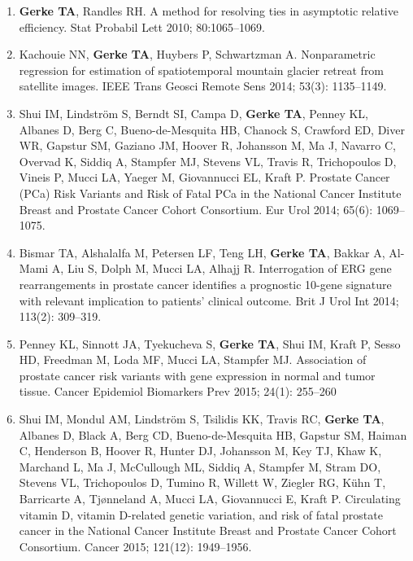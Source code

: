 \documentclass[11pt, a4paper]{article} %
\begin{document}
\begin{enumerate}[leftmargin=*]
\item{} {\bf Gerke TA}, Randles RH. A method for resolving ties in asymptotic relative efficiency.
Stat Probabil Lett 2010; 80:1065--1069.

\item{} Kachouie NN, {\bf Gerke TA}, Huybers P, Schwartzman A. Nonparametric regression for estimation of spatiotemporal mountain glacier retreat from satellite images. IEEE Trans Geosci Remote Sens 2014; 53(3): 1135--1149.

\item{} Shui IM, Lindstr\"{o}m S, Berndt SI, Campa D, {\bf Gerke TA}, Penney KL, Albanes D, Berg C, Bueno-de-Mesquita HB, Chanock S, Crawford ED, Diver WR, Gapstur SM, Gaziano JM, Hoover R, Johansson M, Ma J, Navarro C, Overvad K, Siddiq A, Stampfer MJ, Stevens VL, Travis R, Trichopoulos D, Vineis P, Mucci LA, Yaeger M, Giovannucci EL, Kraft P. Prostate Cancer (PCa) Risk Variants and Risk of Fatal PCa in the National Cancer Institute Breast and Prostate Cancer Cohort Consortium. Eur Urol 2014; 65(6): 1069--1075.

\item{} Bismar TA, Alshalalfa M, Petersen LF, Teng LH, {\bf Gerke TA}, Bakkar A, Al-Mami A, Liu S, Dolph M, Mucci LA, Alhajj R. Interrogation of ERG gene rearrangements in prostate cancer identifies a prognostic 10-gene signature with relevant implication to patients' clinical outcome. Brit J Urol Int 2014; 113(2): 309--319.

\item{} Penney KL, Sinnott JA, Tyekucheva S, {\bf Gerke TA}, Shui IM, Kraft P, Sesso HD, Freedman M, Loda MF, Mucci LA, Stampfer MJ. Association of prostate cancer risk variants with gene expression in normal and tumor tissue. Cancer Epidemiol Biomarkers Prev 2015; 24(1): 255--260

\item{} Shui IM, Mondul AM, Lindstr\"{o}m S, Tsilidis KK, Travis RC, {\bf Gerke TA}, Albanes D, Black A, Berg CD, Bueno-de-Mesquita HB, Gapstur SM, Haiman C, Henderson B, Hoover R, Hunter DJ, Johansson M, Key TJ, Khaw K, Marchand L, Ma J, McCullough ML, Siddiq A, Stampfer M, Stram DO, Stevens VL, Trichopoulos D, Tumino R, Willett W, Ziegler RG, K\"{u}hn T, Barricarte A, Tj\o nneland A, Mucci LA, Giovannucci E, Kraft P. Circulating vitamin D, vitamin D-related genetic variation, and risk of fatal prostate cancer in the National Cancer Institute Breast and Prostate Cancer Cohort Consortium. Cancer 2015; 121(12): 1949--1956.


\end{enumerate}
\end{document}
